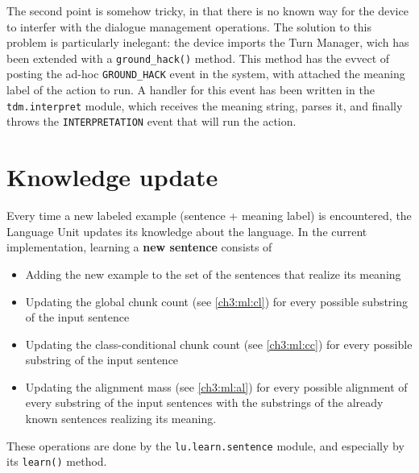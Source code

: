 The second point is somehow tricky, in that there is no known way for the device to interfer with the dialogue management operations. The solution to this problem is particularly inelegant: the device imports the Turn Manager, wich has been extended with a \texttt{ground\_hack()} method. This method has the evvect of posting the ad-hoc \texttt{GROUND\_HACK} event in the system, with attached the meaning label of the action to run. A handler for this event has been written in the \texttt{tdm.interpret} module, which receives the meaning string, parses it, and finally throws the \texttt{INTERPRETATION} event that will run the action.


\section{Knowledge update} \label{ch:interaction:learn}

Every time a new labeled example (sentence + meaning label) is encountered, the Language Unit updates its knowledge about the language. In the current implementation, learning a \textbf{new sentence} consists of
\begin{itemize}
	\item Adding the new example to the set of the sentences that realize its meaning
	\item Updating the global chunk count (see \ref{ch3:ml:cl}) for every possible substring of the input sentence
	\item Updating the class-conditional chunk count (see \ref{ch3:ml:cc}) for every possible substring of the input sentence
	\item Updating the alignment mass (see \ref{ch3:ml:al}) for every possible alignment of every substring of the input sentences with the substrings of the already known sentences realizing its meaning.
\end{itemize}
These operations are done by the \texttt{lu.learn.sentence} module, and especially by its \texttt{learn()} method.